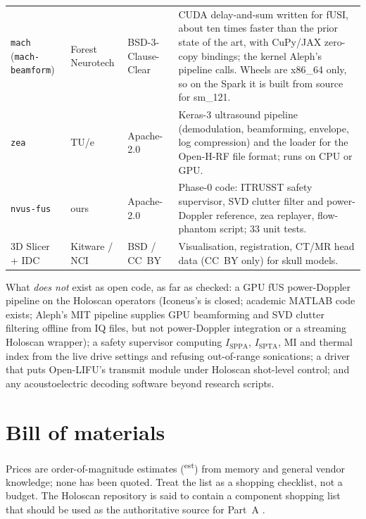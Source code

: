 \documentclass[11pt,a4paper]{article}
\newcommand{\est}{\textsuperscript{est}}
\begin{document}
\begin{longtable}{@{}>{\raggedright\arraybackslash}p{3.3cm}>{\raggedright\arraybackslash}p{2.6cm}>{\raggedright\arraybackslash}p{2.0cm}>{\raggedright\arraybackslash}p{7.2cm}@{}}
\texttt{mach} (\texttt{mach-beamform}) \cite{mach} & Forest Neurotech & BSD-3-Clause-Clear & CUDA delay-and-sum written for fUSI, about ten times faster than the prior state of the art, with CuPy/JAX zero-copy bindings; the kernel Aleph's pipeline calls. Wheels are x86\_64 only, so on the Spark it is built from source for sm\_121. \\
\texttt{zea} \cite{zea} & TU/e & Apache-2.0 & Keras-3 ultrasound pipeline (demodulation, beamforming, envelope, log compression) and the loader for the Open-H-RF file format; runs on CPU or GPU. \\
\texttt{nvus-fus} & ours & Apache-2.0 & Phase-0 code: ITRUSST safety supervisor, SVD clutter filter and power-Doppler reference, zea replayer, flow-phantom script; 33 unit tests. \\
3D Slicer + IDC & Kitware / NCI & BSD / CC~BY & Visualisation, registration, CT/MR head data (CC~BY only) for skull models. \\
\bottomrule
\end{longtable}

What \emph{does not} exist as open code, as far as checked: a GPU fUS power-Doppler pipeline on the Holoscan operators (Iconeus's is closed; academic MATLAB code exists; Aleph's MIT pipeline supplies GPU beamforming and SVD clutter filtering offline from IQ files, but not power-Doppler integration or a streaming Holoscan wrapper); a safety supervisor computing $I_{\mathrm{SPPA}}$, $I_{\mathrm{SPTA}}$, MI and thermal index from the live drive settings and refusing out-of-range sonications; a driver that puts Open-LIFU's transmit module under Holoscan shot-level control; and any acoustoelectric decoding software beyond research scripts.

\section{Bill of materials}\label{sec:bom}

Prices are order-of-magnitude estimates (\est) from memory and general vendor knowledge; none has been quoted. Treat the list as a shopping checklist, not a budget. The Holoscan repository is said to contain a component shopping list that should be used as the authoritative source for Part~A \cite{holoscan}.
\end{document}
